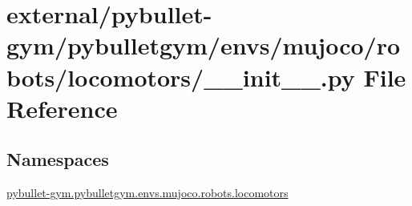 \hypertarget{external_2pybullet-gym_2pybulletgym_2envs_2mujoco_2robots_2locomotors_2____init_____8py}{}\section{external/pybullet-\/gym/pybulletgym/envs/mujoco/robots/locomotors/\+\_\+\+\_\+init\+\_\+\+\_\+.py File Reference}
\label{external_2pybullet-gym_2pybulletgym_2envs_2mujoco_2robots_2locomotors_2____init_____8py}
\subsection*{Namespaces}
\begin{DoxyCompactItemize}
\item 
 \hyperlink{namespacepybullet-gym_1_1pybulletgym_1_1envs_1_1mujoco_1_1robots_1_1locomotors}{pybullet-\/gym.\+pybulletgym.\+envs.\+mujoco.\+robots.\+locomotors}
\end{DoxyCompactItemize}
